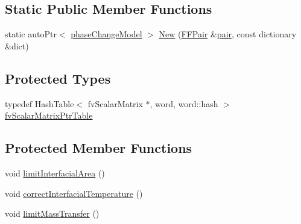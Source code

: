 \subsection*{Static Public Member Functions}
\begin{DoxyCompactItemize}
\item 
static auto\+Ptr$<$ \hyperlink{classFoam_1_1phaseChangeModel}{phase\+Change\+Model} $>$ \hyperlink{classFoam_1_1phaseChangeModel_a1b699138c52c74753235bcd814ee7bb0}{New} (\hyperlink{classFoam_1_1FFPair}{F\+F\+Pair} \&\hyperlink{classFoam_1_1phaseChangeModel_a826deac453e9ba7c6fcda90d7b6b7709}{pair}, const dictionary \&dict)
\end{DoxyCompactItemize}
\subsection*{Protected Types}
\begin{DoxyCompactItemize}
\item 
typedef Hash\+Table$<$ fv\+Scalar\+Matrix $\ast$, word, word\+::hash $>$ \hyperlink{classFoam_1_1phaseChangeModel_a47dacb23df9a151e6da0902f1726ef21}{fv\+Scalar\+Matrix\+Ptr\+Table}
\end{DoxyCompactItemize}
\subsection*{Protected Member Functions}
\begin{DoxyCompactItemize}
\item 
void \hyperlink{classFoam_1_1phaseChangeModel_a83bbe51818d5f8fa41ca19f3d79b0dde}{limit\+Interfacial\+Area} ()
\item 
void \hyperlink{classFoam_1_1phaseChangeModel_aa9020c2a4bc10b0363d27e5ace5674a8}{correct\+Interfacial\+Temperature} ()
\item 
void \hyperlink{classFoam_1_1phaseChangeModel_aa93c4a9b27364904542c70963bef9aa6}{limit\+Mass\+Transfer} ()
\end{DoxyCompactItemize}
